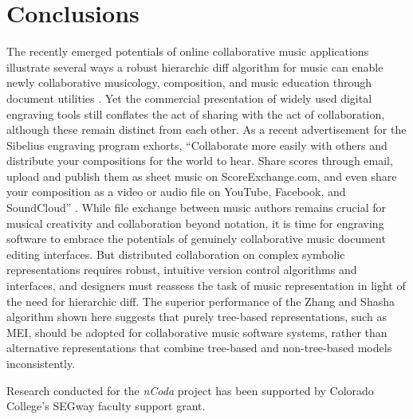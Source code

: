 \documentclass{article}
\begin{document}


\section{Conclusions}
The recently emerged potentials of online collaborative music applications illustrate several ways a robust hierarchic diff algorithm for music can enable newly collaborative musicology, composition, and music education through document utilities \cite{wust2001architectural,Martin:2015pb,McCulloch:2015pd,Flat:aa,Baca:2015xr}.
Yet the commercial presentation of widely used digital engraving tools still conflates the act of sharing with the act of collaboration,
although these remain distinct from each other.
As a recent advertisement for the Sibelius engraving program exhorts,
``Collaborate more easily with others and distribute your compositions for the world to hear.
Share scores through email, upload and publish them as sheet music on ScoreExchange.com,
and even share your composition as a video or audio file on YouTube, Facebook, and SoundCloud'' \cite{Avid:to}.
While file exchange between music authors remains crucial for musical creativity and collaboration beyond notation,
it is time for engraving software to embrace the potentials of genuinely collaborative music document editing interfaces. But distributed collaboration on complex symbolic representations requires robust, intuitive version control algorithms and interfaces, and designers must reassess the task of music representation in light of the need for hierarchic diff. The superior performance of the Zhang and Shasha algorithm shown here suggests that purely tree-based representations, such as MEI, should be adopted for collaborative music software systems, rather than alternative representations that combine tree-based and non-tree-based models inconsistently.

%
\begin{acknowledgments}
Research conducted for the \emph{nCoda} project has been supported by Colorado College's SEGway faculty support grant.
\end{acknowledgments}

\balance

\end{document}

